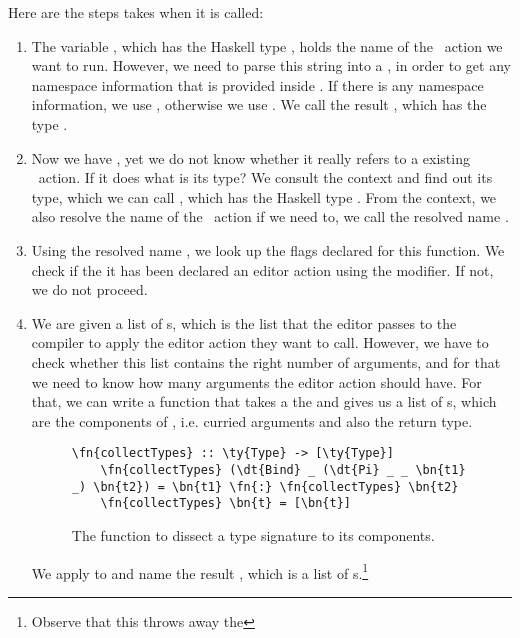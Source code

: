 Here are the steps  takes when it is called:
\begin{enumerate}
  \item The variable , which has the Haskell type ,
    holds the name of the \Elab\ action we want to run. However, we need
    to parse this string into a , in order to get any namespace
    information that is provided inside .
    If there is any namespace information, we use , otherwise we use
    .  We call the result , which has the type .
  \item Now we have , yet we do not know whether it really refers to a
    existing \Elab\ action. If it does what is its type?
    We consult the context and find out its type, which we can call , which
    has the Haskell type . From the context, we also resolve the
    name of the \Elab\ action if we need to, we call the resolved name .
  \item Using the resolved name , we look up the flags declared for this function.
    We check if the it has been declared an editor action using the
     modifier.  If not, we do not proceed.
  \item We are given a list of s, which is the list that the editor
    passes to the compiler to apply the editor action they want to call.
    However, we have to check whether this list contains the right number of
    arguments, and for that we need to know how many arguments the editor action should have.
    For that, we can write a function  that takes a the
      and gives us a list of s, which are the
    components of , i.e.  curried arguments and also the return type.
    \begin{figure}[ht]
    \caption{The function  to dissect a type signature to its components.}
    \label{code:collectTypes}
    \begin{Verbatim}[framesep=2mm, label=\footnotesize{\normalfont{Haskell}}, labelposition=topline]
    \fn{collectTypes} :: \ty{Type} -> [\ty{Type}]
    \fn{collectTypes} (\dt{Bind} _ (\dt{Pi} _ _ \bn{t1} _) \bn{t2}) = \bn{t1} \fn{:} \fn{collectTypes} \bn{t2}
    \fn{collectTypes} \bn{t} = [\bn{t}]
    \end{Verbatim}
    \end{figure}
    We apply  to  and name the result ,
    which is a list of s.\footnote{Observe that this throws away the
}
\end{enumerate}

